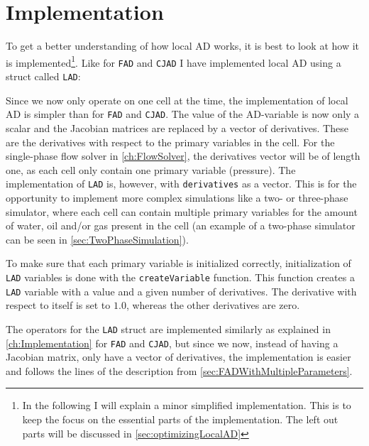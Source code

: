 \section{Implementation}
\label{sec:LADImplementation}
To get a better understanding of how local AD works, it is best to look at how it is implemented\footnote{In the following I will explain a minor simplified implementation. This is to keep the focus on the essential parts of the implementation. The left out parts will be discussed in \autoref{sec:optimizingLocalAD}}. Like for \texttt{FAD} and \texttt{CJAD} I have implemented local AD using a struct called \texttt{LAD}:

Since we now only operate on one cell at the time, the implementation of local AD is simpler than for \texttt{FAD} and \texttt{CJAD}. The value of the AD-variable is now only a scalar and the Jacobian matrices are replaced by a vector of derivatives. These are the derivatives  with respect to the primary variables in the cell. For the single-phase flow solver in \autoref{ch:FlowSolver}, the derivatives vector will be of length one, as each cell only contain one primary variable (pressure). The implementation of \texttt{LAD} is, however, with \texttt{derivatives} as a vector. This is for the opportunity to implement more complex simulations like a two- or three-phase simulator, where each cell can contain multiple primary variables for the amount of water, oil and/or gas present in the cell (an example of a two-phase simulator can be seen in \autoref{sec:TwoPhaseSimulation}).

To make sure that each primary variable is initialized correctly, initialization of \texttt{LAD} variables is done with the \texttt{createVariable} function. This function creates a \texttt{LAD} variable with a value and a given number of derivatives. The derivative with respect to itself is set to $1.0$, whereas the other derivatives are zero.

The operators for the \texttt{LAD} struct are implemented similarly as explained in \autoref{ch:Implementation} for \texttt{FAD} and \texttt{CJAD}, but since we now, instead of having a Jacobian matrix, only have a vector of derivatives, the implementation is easier and follows the lines of the description from \autoref{sec:FADWithMultipleParameters}. 

